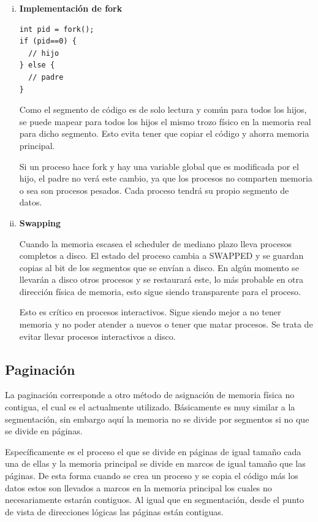 \begin{enumerate}[i.]
\item \textbf{Implementación de fork}

\begin{verbatim}
int pid = fork();
if (pid==0) {
  // hijo
} else {
  // padre
}
\end{verbatim}

Como el segmento de código es de solo lectura y común para todos los hijos, se
puede mapear para todos los hijos el mismo trozo físico en la memoria real para
dicho segmento. Esto evita tener que copiar el código y ahorra memoria
principal.

Si un proceso hace fork y hay una variable global que es modificada por el hijo,
el padre no verá este cambio, ya que los procesos no comparten memoria o sea son
procesos pesados. Cada proceso tendrá su propio segmento de datos.

\item \textbf{Swapping}

Cuando la memoria escasea el scheduler de mediano plazo lleva procesos completos
a disco. El estado del proceso cambia a SWAPPED y se guardan copias al bit de
los segmentos que se envían a disco. En algún momento se llevarán a disco otros
procesos y se restaurará este, lo más probable en otra dirección física de
memoria, esto sigue siendo transparente para el proceso.

Esto es crítico en procesos interactivos. Sigue siendo mejor a no tener memoria
y no poder atender a nuevos o tener que matar procesos. Se trata de evitar
llevar procesos interactivos a disco.

\end{enumerate}

\subsection{Paginación}
La paginación corresponde a otro método de asignación de memoria física no
contigua, el cual es el actualmente utilizado. Básicamente es muy similar a la
segmentación, sin embargo aquí la memoria no se divide por segmentos si no que
se divide en páginas.

Específicamente es el proceso el que se divide en páginas de igual tamaño cada
una de ellas y la memoria principal se divide en marcos de igual tamaño que las
páginas. De esta forma cuando se crea un proceso y se copia el código más los
datos estos son llevados a marcos en la memoria principal los cuales no
necesariamente estarán contiguos. Al igual que en segmentación, desde el punto
de vista de direcciones lógicas las páginas están contiguas.

